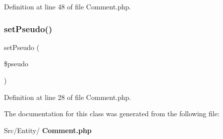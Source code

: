 Definition at line 48 of file Comment.\+php.

\mbox{\label{class_src_1_1_entity_1_1_comment_a1d65ce1d25ffb871a48d33715e6b6bef}} 
\subsubsection{set\+Pseudo()}
{\footnotesize\ttfamily set\+Pseudo (\begin{DoxyParamCaption}\item[{}]{\$pseudo }\end{DoxyParamCaption})}



Definition at line 28 of file Comment.\+php.



The documentation for this class was generated from the following file\+:\begin{DoxyCompactItemize}
\item 
Src/\+Entity/\textbf{ Comment.\+php}\end{DoxyCompactItemize}
